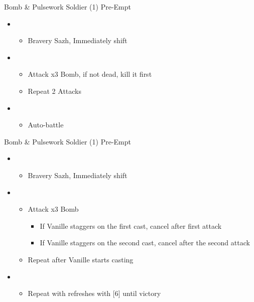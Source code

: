 \begin{paracol}{2}
\begin{battle}{Bomb \& Pulsework Soldier (1) Pre-Empt}
		\begin{itemize}
			\item \second
			      \begin{itemize}
				      \item Bravery Sazh, Immediately shift
			      \end{itemize}
			\item \third
			      \begin{itemize}
				      \item Attack x3 Bomb, if not dead, kill it first
				      \item Repeat 2  Attacks
			      \end{itemize}
			\item \first
			      \begin{itemize}
				      \item Auto-battle
			      \end{itemize}
		\end{itemize}
	\end{battle}
	\switchcolumn
	\begin{battle}{Bomb \& Pulsework Soldier (1) Pre-Empt}
		\begin{itemize}
			\item \second
			      \begin{itemize}
				      \item Bravery Sazh, Immediately shift
			      \end{itemize}
			\item \third
			      \begin{itemize}
				      \item Attack x3 Bomb
				            \begin{itemize}
					            \item If Vanille staggers on the first cast, cancel after first attack
					            \item If Vanille staggers on the second cast, cancel after the second attack
				            \end{itemize}
				      \item Repeat after Vanille starts casting
			      \end{itemize}
			\item \first
			      \begin{itemize}
				      \item Repeat with refreshes with [6] until victory
			      \end{itemize}
		\end{itemize}
	\end{battle}
	\switchcolumn*


\end{paracol}
